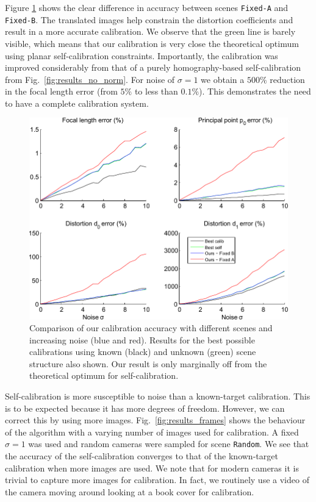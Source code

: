 \documentclass[10pt,twocolumn,letterpaper]{article}
\begin{document}
Figure \ref{fig:results_noise} shows the clear difference in accuracy between scenes \texttt{Fixed-A} and \texttt{Fixed-B}. The translated images help constrain the distortion coefficients and result in a more accurate calibration. We observe that the green line is barely visible, which means that our calibration is very close the theoretical optimum using planar self-calibration constraints. Importantly, the calibration was improved considerably from that of a purely homography-based self-calibration from Fig.~\ref{fig:results_no_norm}. For noise of $\sigma=1$ we obtain a $500\%$ reduction in the focal length error (from $5\%$ to less than $0.1\%$). This demonstrates the need to have a complete calibration system. 

\begin{figure}
\centering
\includegraphics[width=\linewidth]{images/resultsPointNoise.pdf}
\caption{Comparison of our calibration accuracy with different scenes and increasing noise (blue and red). Results for the best possible calibrations using known (black) and unknown (green) scene structure also shown. Our result is only marginally off from the theoretical optimum for self-calibration.}
\label{fig:results_noise}
\end{figure}

Self-calibration is more susceptible to noise than a known-target calibration. This is to be expected because it has more degrees of freedom. However, we can correct this by using more images. Fig.~\ref{fig:results_frames} shows the behaviour of the algorithm with a varying number of images used for calibration. A fixed $\sigma=1$ was used and random cameras were sampled for scene \texttt{Random}. We see that the accuracy of the self-calibration converges to that of the known-target calibration when more images are used. We note that for modern cameras it is trivial to capture more images for calibration. In fact, we routinely use a video of the camera moving around looking at a book cover for calibration.
\end{document}
